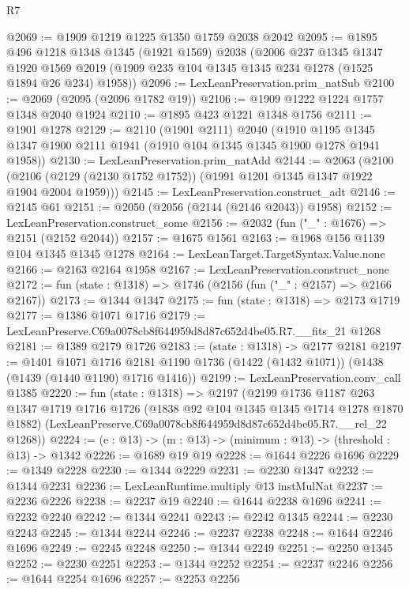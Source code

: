 \begin{lexlean}{R7}
\begin{coremodule}
@2069 := @1909 @1219 @1225 @1350 @1759 @2038 @2042
@2095 := @1895
    @496
    @1218
    @1348
    @1345
    (@1921 @1569)
    @2038
    (@2006
      @237
      @1345
      @1347
      @1920
      @1569
      @2019
      (@1909 @235 @104 @1345 @1345 @234 @1278 (@1525 @1894 @26 @234) @1958))
@2096 := LexLeanPreservation.prim_natSub
@2100 := @2069 (@2095 (@2096 @1782 @19))
@2106 := @1909 @1222 @1224 @1757 @1348 @2040 @1924
@2110 := @1895 @423 @1221 @1348 @1756
@2111 := @1901 @1278
@2129 := @2110
    (@1901 @2111)
    @2040
    (@1910 @1195 @1345 @1347 @1900 @2111 @1941 (@1910 @104 @1345 @1345 @1900 @1278 @1941 @1958))
@2130 := LexLeanPreservation.prim_natAdd
@2144 := @2063
    (@2100 (@2106 (@2129 (@2130 @1752 @1752)) (@1991 @1201 @1345 @1347 @1922 @1904 @2004 @1959)))
@2145 := LexLeanPreservation.construct_adt
@2146 := @2145 @61
@2151 := @2050 (@2056 (@2144 (@2146 @2043)) @1958)
@2152 := LexLeanPreservation.construct_some
@2156 := @2032 (fun ("_" : @1676) => @2151 (@2152 @2044))
@2157 := @1675 @1561
@2163 := @1968 @156 @1139 @104 @1345 @1345 @1278
@2164 := LexLeanTarget.TargetSyntax.Value.none
@2166 := @2163 @2164 @1958
@2167 := LexLeanPreservation.construct_none
@2172 := fun (state : @1318) => @1746 (@2156 (fun ("_" : @2157) => @2166 @2167))
@2173 := @1344 @1347
@2175 := fun (state : @1318) => @2173 @1719
@2177 := @1386 @1071 @1716
@2179 := LexLeanPreserve.C69a0078cb8f644959d8d87c652d4be05.R7.__fits_21 @1268
@2181 := @1389 @2179 @1726
@2183 := (state : @1318) -> @2177 @2181
@2197 := @1401
    @1071
    @1716
    @2181
    @1190
    @1736
    (@1422 (@1432 @1071))
    (@1438 (@1439 (@1440 @1190) @1716 @1416))
@2199 := LexLeanPreservation.conv_call @1385
@2220 := fun (state : @1318) =>
  @2197
    (@2199
      @1736
      @1187
      @263
      @1347
      @1719
      @1716
      @1726
      (@1838 @92 @104 @1345 @1345 @1714 @1278 @1870 @1882)
      (LexLeanPreserve.C69a0078cb8f644959d8d87c652d4be05.R7.__rel_22 @1268))
@2224 := (e : @13) -> (m : @13) -> (minimum : @13) -> (threshold : @13) -> @1342
@2226 := @1689 @19 @19
@2228 := @1644 @2226 @1696
@2229 := @1349 @2228
@2230 := @1344 @2229
@2231 := @2230 @1347
@2232 := @1344 @2231
@2236 := LexLeanRuntime.multiply @13 instMulNat
@2237 := @2236 @2226
@2238 := @2237 @19
@2240 := @1644 @2238 @1696
@2241 := @2232 @2240
@2242 := @1344 @2241
@2243 := @2242 @1345
@2244 := @2230 @2243
@2245 := @1344 @2244
@2246 := @2237 @2238
@2248 := @1644 @2246 @1696
@2249 := @2245 @2248
@2250 := @1344 @2249
@2251 := @2250 @1345
@2252 := @2230 @2251
@2253 := @1344 @2252
@2254 := @2237 @2246
@2256 := @1644 @2254 @1696
@2257 := @2253 @2256

\end{coremodule}
\end{lexlean}
